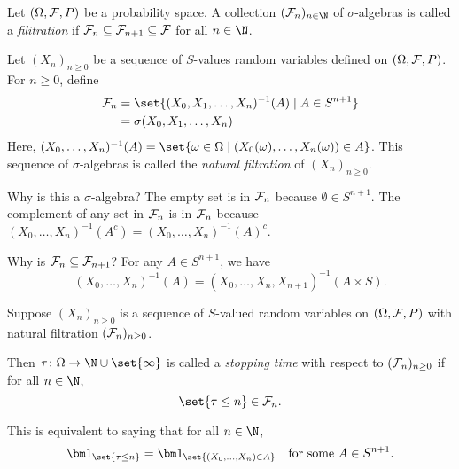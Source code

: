 \begin{definition}[Filtration] \label{def:filtration}
    Let $(\Omega, \mathcal{F}, P)$ be a probability space.
    A collection $(\F_n)_{n \in \N}$ of $\sigma$-algebras is called a
    \emph{filitration} if $\mathcal{F}_n \subseteq \mathcal{F}_{n+1} \subseteq \mathcal{F}$ for all
    $n \in \N$.
\end{definition}
\begin{definition} \label{def:natural_filtration}
    Let $(X_n)_{n \ge 0}$ be a sequence of $S$-values random variables
    defined on $(\Omega, \mathcal{F}, P)$.
    For $n \ge 0$, define \begin{align*}
        \F_n &= \set{(X_0, X_1, \dots, X_n)^{-1}(A) \mid A \in S^{n+1}} \\
            &= \sigma(X_0, X_1, \dots, X_n)
    \end{align*}
    Here, $(X_0, \dots, X_n)^{-1}(A) = \set{\omega \in \Omega \mid
    (X_0(\omega), \dots, X_n(\omega)) \in A}$.
    This sequence of $\sigma$-algebras is called the \emph{natural
    filtration} of $(X_n)_{n \ge 0}$.
\end{definition}
Why is this a $\sigma$-algebra?
The empty set is in $\mathcal{F}_n$ because $\emptyset \in S^{n+1}$.
The complement of any set in $\mathcal{F}_n$ is in $\mathcal{F}_n$ because
$(X_0, \dots, X_n)^{-1}(A^c) = (X_0, \dots, X_n)^{-1}(A)^c$.

Why is $\mathcal{F}_n \subseteq \mathcal{F}_{n+1}$?
For any $A \in S^{n+1}$, we have \[
    (X_0, \dots, X_n)^{-1}(A) = (X_0, \dots, X_n, X_{n+1})^{-1}(A \times S).
\]

\begin{definition} \label{def:stopping_time}
    Suppose $(X_n)_{n \ge 0}$ is a sequence of $S$-valued random variables
    on $(\Omega, \mathcal{F}, P)$ with natural filtration $(\mathcal{F}_n)_{n \ge 0}$.

    Then $\tau \colon \Omega \to \N \cup \set{\infty}$ is called a
    \emph{stopping time} with respect to $(\mathcal{F}_n)_{n \ge 0}$ if for all
    $n \in \N$, \[
        \set{\tau \le n} \in \F_n.
    \]
\end{definition}
This is equivalent to saying that for all $n \in \N$, \[
    \ind{\set{\tau \le n}} = \ind{\set{(X_0, \dots, X_n) \in A}}
    \quad \text{for some } A \in S^{n+1}.
\]

